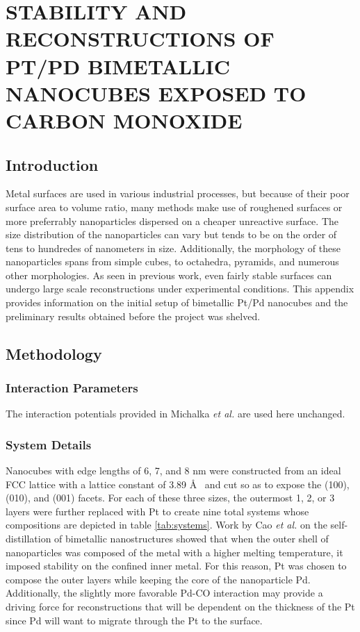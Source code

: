
\chapter{STABILITY AND RECONSTRUCTIONS OF PT/PD BIMETALLIC NANOCUBES EXPOSED TO CARBON MONOXIDE}

\section{Introduction}

Metal surfaces are used in various industrial processes, but because of their
poor surface area to volume ratio, many methods make use of roughened surfaces
or more preferrably nanoparticles dispersed on a cheaper unreactive
surface.\citep{Munnik:2015qf, Graham:2007ng} The size distribution of the
nanoparticles can vary but tends to be on the order of tens to hundredes of
nanometers in size.\citep{Zhang:2011ne, Liu:2013hf} Additionally, the
morphology of these nanoparticles spans from simple cubes, to octahedra,
pyramids, and numerous other morphologies.\citep{Ahmadi:2015os, Wang:2015qb,
Wang:2016dg} As seen in previous work\citep{Tao:2010aa, Michalka:2013aa,
Michalka:2015aa, Kim:2016cr}, even fairly stable surfaces can undergo large
scale reconstructions under experimental conditions. This appendix provides
information on the initial setup of bimetallic Pt/Pd nanocubes and the
preliminary results obtained before the project was shelved. 

\section{Methodology}
\subsection{Interaction Parameters}
The interaction potentials provided in Michalka {\em et
al.}\citep{Michalka:2015aa} are used here unchanged. 

\subsection{System Details}
Nanocubes with edge lengths of 6, 7, and 8 nm were constructed from an ideal
 FCC lattice with a lattice constant of 3.89 \AA~  and cut so as to
expose the (100), (010), and (001) facets. For each of these three sizes, the
outermost 1, 2, or 3 layers were further replaced with Pt to create nine total
systems whose compositions are depicted in table \ref{tab:systems}. Work by Cao
{\it et al.}\citep{Cao:2010gf} on the self-distillation of bimetallic
nanostructures showed that when the outer shell of nanoparticles was composed
of the metal with a higher melting temperature, it imposed stability on the
confined inner metal. For this reason, Pt was chosen to compose the outer
layers while keeping the core of the nanoparticle Pd. Additionally, the
slightly more favorable Pd-CO interaction may provide a driving force for
reconstructions that will be dependent on the thickness of the Pt since Pd will
want to migrate through the Pt to the surface.

